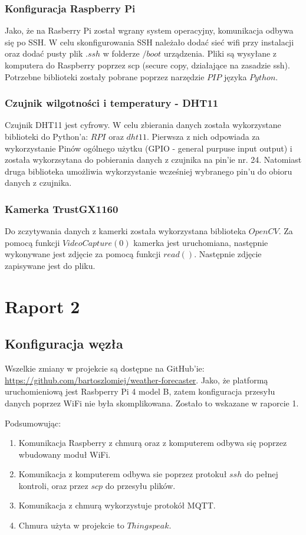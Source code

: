 \documentclass[runningheads]{llncs}
\begin{document}
\subsubsection{Konfiguracja Raspberry Pi}
Jako, że na Rasberry Pi został wgrany system operacyjny, komunikacja odbywa się po SSH. W celu skonfigurowania SSH należało dodać sieć wifi przy instalacji oraz dodać pusty plik $.ssh$ w folderze $/boot$ urządzenia. Pliki są wysyłane z komputera do Raspberry poprzez scp (secure copy, działające na zasadzie ssh). Potrzebne biblioteki zostały pobrane poprzez narzędzie $PIP$ języka $Python$.
\subsubsection{Czujnik wilgotności i temperatury - DHT11}
Czujnik DHT11 jest cyfrowy. W celu zbierania danych została wykorzystane biblioteki do Python'a: $RPI$ oraz $dht11$. Pierwsza z nich odpowiada za wykorzystanie Pinów ogólnego użytku (GPIO - general purpuse input output) i została wykorzsytana do pobierania danych z czujnika na pin'ie nr. 24. Natomiast druga biblioteka umożliwia wykorzystanie wcześniej wybranego pin'u do obioru danych z czujnika.
\subsubsection{Kamerka TrustGX1160}
Do zczytywania danych z kamerki została wykorzystana biblioteka $OpenCV$. Za pomocą funkcji $VideoCapture(0)$ kamerka jest uruchomiana, następnie wykonywane jest zdjęcie za pomocą funkcji $read()$. Następnie zdjęcie zapisywane jest do pliku.
\newpage
\section{Raport 2}
\subsection{Konfiguracja węzła}
Wszelkie zmiany w projekcie są dostępne na GitHub'ie: \url{https://github.com/bartoszlomiej/weather-forecaster}.
Jako, że platformą uruchomieniową jest Rasbperry Pi 4 model B, zatem konfiguracja przesyłu danych poprzez WiFi nie była skomplikowana. Zostało to wskazane w raporcie 1.

Podsumowując:
\begin{enumerate}
\item Komunikacja Raspberry z chmurą oraz z komputerem odbywa się poprzez wbudowany moduł WiFi.
\item Komunikacja z komputerem odbywa sie poprzez protokuł $ssh$ do pełnej kontroli, oraz przez $scp$ do przesyłu plików.
\item Komunikacja z chmurą wykorzystuje protokół MQTT.
\item Chmura użyta w projekcie to $Thingspeak$.
\end{enumerate}
\end{document}
